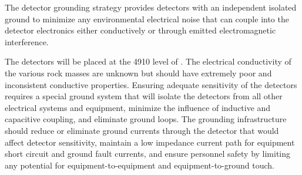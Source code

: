 The detector grounding strategy provides detectors with an independent
isolated ground to minimize any environmental electrical noise that
can couple into the detector electronics either conductively or
through emitted electromagnetic interference.


The detectors will be placed at the 4910 level of \surf. The
electrical conductivity of the various rock masses are unknown but
should have extremely poor and inconsistent conductive
properties. Ensuring adequate sensitivity of the detectors requires a
special ground system that will isolate the detectors from all other
electrical systems and equipment, minimize the influence of inductive
and capacitive coupling, and eliminate ground loops. The grounding
infrastructure should reduce or eliminate ground currents through the
detector that would affect detector sensitivity, maintain a low
impedance current path for equipment short circuit and ground fault
currents, and ensure personnel safety by limiting any potential for
equipment-to-equipment and equipment-to-ground touch.


